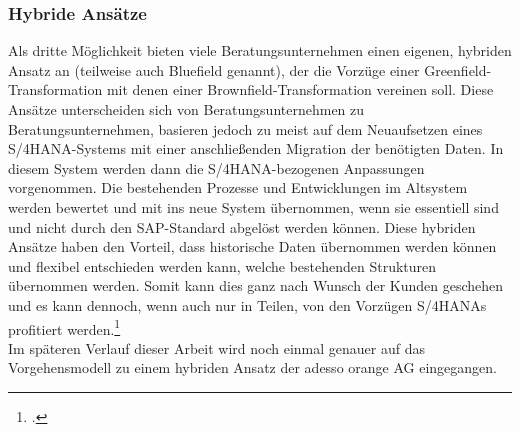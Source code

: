 \subsubsection{Hybride Ansätze}
Als dritte Möglichkeit bieten viele Beratungsunternehmen einen eigenen, hybriden Ansatz an (teilweise auch \glqq{}Bluefield\grqq{} genannt), der die Vorzüge einer Greenfield-Transformation mit denen einer Brownfield-Transformation vereinen soll. Diese Ansätze unterscheiden sich von Beratungsunternehmen zu Beratungsunternehmen, basieren jedoch zu meist auf dem Neuaufsetzen eines S/4HANA-Systems mit einer anschließenden Migration der benötigten Daten. In diesem System werden dann die S/4HANA-bezogenen Anpassungen vorgenommen. Die bestehenden Prozesse und Entwicklungen im Altsystem werden bewertet und mit ins neue System übernommen, wenn sie essentiell sind und nicht durch den SAP-Standard abgelöst werden können. Diese hybriden Ansätze haben den Vorteil, dass historische Daten übernommen werden können und flexibel entschieden werden kann, welche bestehenden Strukturen übernommen werden. Somit kann dies ganz nach Wunsch der Kunden geschehen und es kann dennoch, wenn auch nur in Teilen, von den Vorzügen S/4HANAs profitiert werden.\footcite[Vgl.][]{hybrideransatz}\\
Im späteren Verlauf dieser Arbeit wird noch einmal genauer auf das Vorgehensmodell zu einem hybriden Ansatz der \glqq{}adesso orange AG\grqq{} eingegangen.
